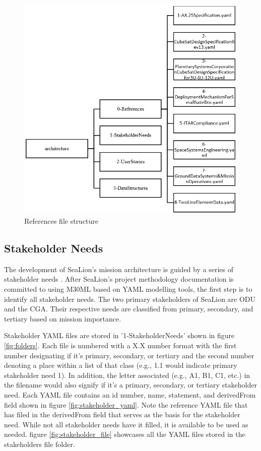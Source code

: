 \documentclass[journal,article,submit,pdftex,moreauthors]{Definitions/mdpi}
\begin{document}
\begin{figure}[H]
    \includegraphics[width=10.5 cm]{assets/reference_file.png}
    \caption{References file structure}
	\label{fig:reference_file}
    \end{figure}   
\unskip

\subsection{Stakeholder Needs}
The development of SeaLion's mission architecture is guided by a series of stakeholder needs \cite{sealion_dof}.  After SeaLion's project methodology documentation is committed to using M30ML based on YAML modelling tools, the first step is to identify all stakeholder needs.  The two primary stakeholders of SeaLion are ODU and the CGA.  Their respective needs are classified from primary, secondary, and tertiary based on mission importance.

Stakeholder YAML files are stored in '1-StakeholderNeeds' shown in figure \ref{fig:folders}.  Each file is numbered with a X.X number format with the first number designating if it's primary, secondary, or tertiary and the second number denoting a place within a list of that class (e.g., 1.1 would indicate primary stakeholder need 1).  In addition, the letter associated (e.g., A1, B1, C1, etc.) in the filename would also signify if it's a primary, secondary, or tertiary stakeholder need. Each YAML file contains an id number, name, statement, and derivedFrom field shown in figure \ref{fig:stakeholder_yaml}.  Note the reference YAML file that has filed in the derivedFrom field that serves as the basis for the stakeholder need.  While not all stakeholder needs have it filled, it is available to be used as needed.  figure \ref{fig:stakeholder_file} showcases all the YAML files stored in the stakeholders file folder.
\end{document}
